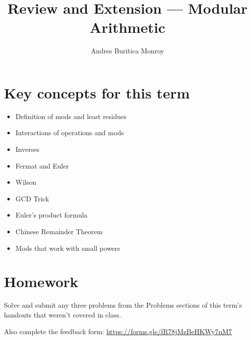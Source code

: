 \documentclass{article}
\title{Review and Extension --- Modular Arithmetic}
\author{Andres Buritica Monroy}
\date{}
\begin{document}
\maketitle
\section{Key concepts for this term}
\begin{itemize}
	\item Definition of mods and least residues
	\item Interactions of operations and mods
	\item Inverses
	\item Fermat and Euler
	\item Wilson
	\item GCD Trick
	\item Euler's product formula
	\item Chinese Remainder Theorem
	\item Mods that work with small powers
\end{itemize}
\section{Homework}
Solve and submit any three problems from the Problems sections of this
term's handouts that weren't covered in class.

Also complete the feedback form:
\url{https://forms.gle/fR78jMzBeHKWy7nM7}
\end{document}
